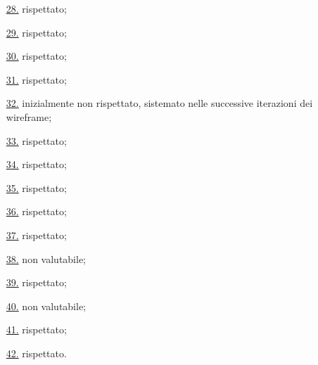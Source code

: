 \begin{itemize}
    \item[{\hyperref[lg:28]{28.}}] rispettato;
    \item[{\hyperref[lg:29]{29.}}] rispettato;
    \item[{\hyperref[lg:30]{30.}}] rispettato;
    \item[{\hyperref[lg:31]{31.}}] rispettato;
    \item[{\hyperref[lg:32]{32.}}] inizialmente non rispettato, sistemato nelle successive iterazioni dei wireframe;
    \item[{\hyperref[lg:33]{33.}}] rispettato;
    \item[{\hyperref[lg:34]{34.}}] rispettato;
    \item[{\hyperref[lg:35]{35.}}] rispettato;
    \item[{\hyperref[lg:36]{36.}}] rispettato;
    \item[{\hyperref[lg:37]{37.}}] rispettato;
    \item[{\hyperref[lg:38]{38.}}] non valutabile;
    \item[{\hyperref[lg:39]{39.}}] rispettato;
    \item[{\hyperref[lg:40]{40.}}] non valutabile;
    \item[{\hyperref[lg:41]{41.}}] rispettato;
    \item[{\hyperref[lg:42]{42.}}] rispettato.
\end{itemize}